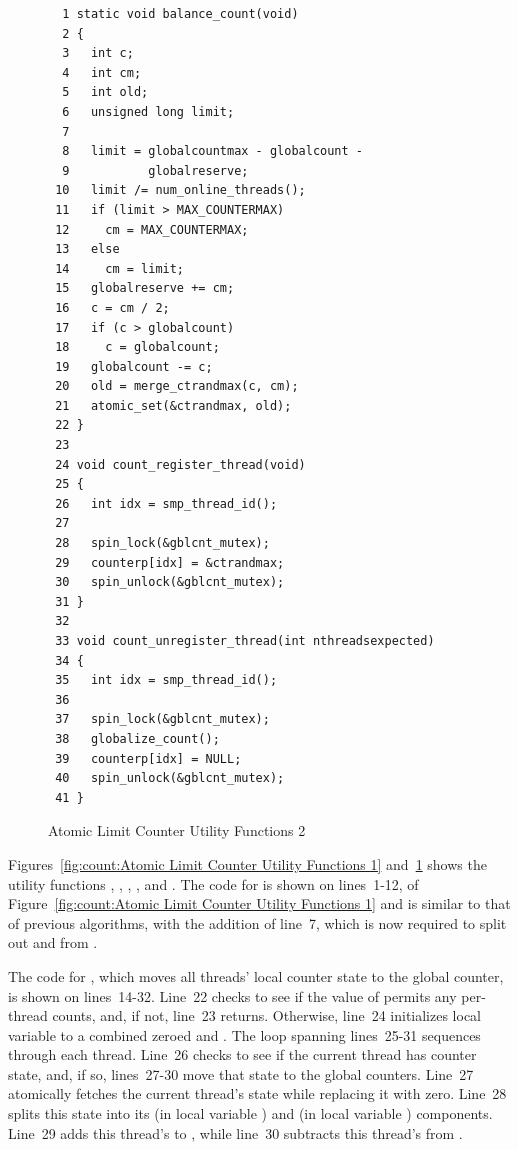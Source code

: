 \begin{figure}[tbp]
{ \scriptsize
\begin{verbatim}
  1 static void balance_count(void)
  2 {
  3   int c;
  4   int cm;
  5   int old;
  6   unsigned long limit;
  7 
  8   limit = globalcountmax - globalcount -
  9           globalreserve;
 10   limit /= num_online_threads();
 11   if (limit > MAX_COUNTERMAX)
 12     cm = MAX_COUNTERMAX;
 13   else
 14     cm = limit;
 15   globalreserve += cm;
 16   c = cm / 2;
 17   if (c > globalcount)
 18     c = globalcount;
 19   globalcount -= c;
 20   old = merge_ctrandmax(c, cm);
 21   atomic_set(&ctrandmax, old);
 22 }
 23 
 24 void count_register_thread(void)
 25 {
 26   int idx = smp_thread_id();
 27 
 28   spin_lock(&gblcnt_mutex);
 29   counterp[idx] = &ctrandmax;
 30   spin_unlock(&gblcnt_mutex);
 31 }
 32 
 33 void count_unregister_thread(int nthreadsexpected)
 34 {
 35   int idx = smp_thread_id();
 36 
 37   spin_lock(&gblcnt_mutex);
 38   globalize_count();
 39   counterp[idx] = NULL;
 40   spin_unlock(&gblcnt_mutex);
 41 }
\end{verbatim}
}
\caption{Atomic Limit Counter Utility Functions 2}
\label{fig:count:Atomic Limit Counter Utility Functions 2}
\end{figure}

Figures~\ref{fig:count:Atomic Limit Counter Utility Functions 1}
and~\ref{fig:count:Atomic Limit Counter Utility Functions 2}
shows the utility functions
,
,
,
, and
.
The code for  is shown on lines~1-12,
of Figure~\ref{fig:count:Atomic Limit Counter Utility Functions 1} and
is similar to that of previous algorithms, with the addition of
line~7, which is now required to split out  and
 from .

The code for , which moves all threads' local
counter state to the global counter, is shown on lines~14-32.
Line~22 checks to see if the value of  permits
any per-thread counts, and, if not, line~23 returns.
Otherwise, line~24 initializes local variable  to a combined
zeroed  and .
The loop spanning lines~25-31 sequences through each thread.
Line~26 checks to see if the current thread has counter state,
and, if so, lines~27-30 move that state to the global counters.
Line~27 atomically fetches the current thread's state
while replacing it with zero.
Line~28 splits this state into its  (in local variable )
and  (in local variable ) components.
Line~29 adds this thread's  to , while
line~30 subtracts this thread's  from .

